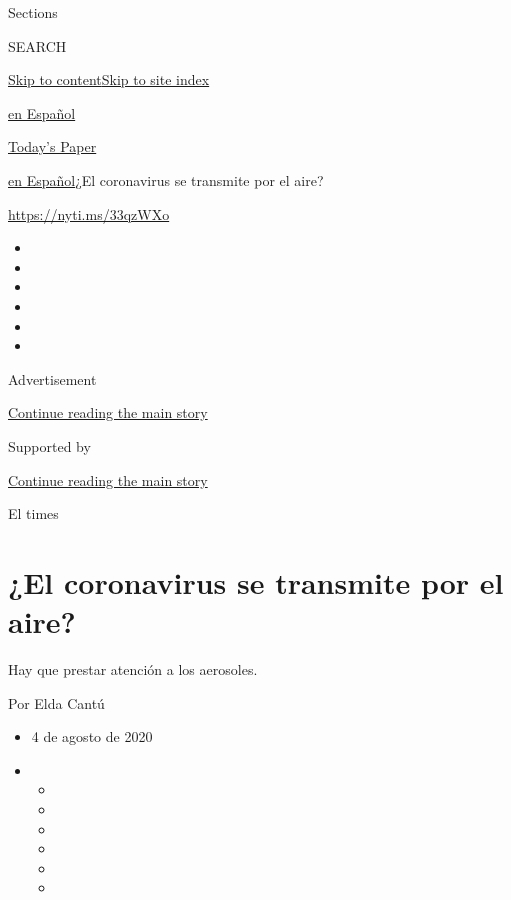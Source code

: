 Sections

SEARCH

\protect\hyperlink{site-content}{Skip to
content}\protect\hyperlink{site-index}{Skip to site index}

\href{https://www.nytimes3xbfgragh.onion/es/}{en Español}

\href{https://myaccount.nytimes3xbfgragh.onion/auth/login?response_type=cookie\&client_id=vi}{}

\href{https://www.nytimes3xbfgragh.onion/section/todayspaper}{Today's
Paper}

\href{/es/}{en Español}\textbar{}¿El coronavirus se transmite por el
aire?

\url{https://nyti.ms/33qzWXo}

\begin{itemize}
\item
\item
\item
\item
\item
\item
\end{itemize}

Advertisement

\protect\hyperlink{after-top}{Continue reading the main story}

Supported by

\protect\hyperlink{after-sponsor}{Continue reading the main story}

El times

\hypertarget{el-coronavirus-se-transmite-por-el-aire}{%
\section{¿El coronavirus se transmite por el
aire?}\label{el-coronavirus-se-transmite-por-el-aire}}

Hay que prestar atención a los aerosoles.

Por Elda Cantú

\begin{itemize}
\item
  4 de agosto de 2020
\item
  \begin{itemize}
  \item
  \item
  \item
  \item
  \item
  \item
  \end{itemize}
\end{itemize}


